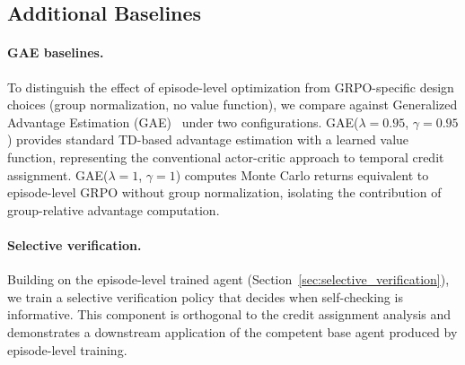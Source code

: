 
\subsection{Additional Baselines}
\label{sec:additional_baselines}

\paragraph{GAE baselines.}
To distinguish the effect of episode-level optimization from GRPO-specific design choices (group normalization, no value function), we compare against Generalized Advantage Estimation (GAE)~\cite{schulman2016gae} under two configurations. GAE($\lambda = 0.95$, $\gamma = 0.95$) provides standard TD-based advantage estimation with a learned value function, representing the conventional actor-critic approach to temporal credit assignment. GAE($\lambda = 1$, $\gamma = 1$) computes Monte Carlo returns equivalent to episode-level GRPO without group normalization, isolating the contribution of group-relative advantage computation. 

\paragraph{Selective verification.}
Building on the episode-level trained agent (Section~\ref{sec:selective_verification}), we train a selective verification policy that decides when self-checking is informative. This component is orthogonal to the credit assignment analysis and demonstrates a downstream application of the competent base agent produced by episode-level training. 
